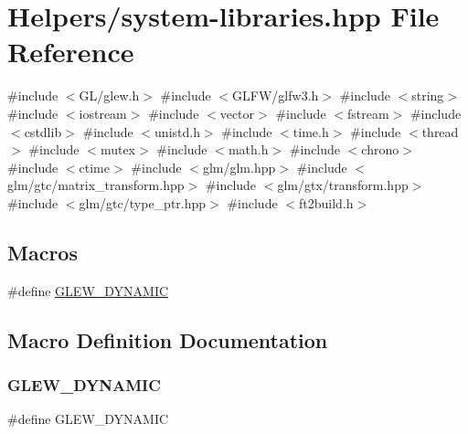 \hypertarget{system-libraries_8hpp}{}\section{Helpers/system-\/libraries.hpp File Reference}
\label{system-libraries_8hpp}
{\ttfamily \#include $<$G\+L/glew.\+h$>$}\newline
{\ttfamily \#include $<$G\+L\+F\+W/glfw3.\+h$>$}\newline
{\ttfamily \#include $<$string$>$}\newline
{\ttfamily \#include $<$iostream$>$}\newline
{\ttfamily \#include $<$vector$>$}\newline
{\ttfamily \#include $<$fstream$>$}\newline
{\ttfamily \#include $<$cstdlib$>$}\newline
{\ttfamily \#include $<$unistd.\+h$>$}\newline
{\ttfamily \#include $<$time.\+h$>$}\newline
{\ttfamily \#include $<$thread$>$}\newline
{\ttfamily \#include $<$mutex$>$}\newline
{\ttfamily \#include $<$math.\+h$>$}\newline
{\ttfamily \#include $<$chrono$>$}\newline
{\ttfamily \#include $<$ctime$>$}\newline
{\ttfamily \#include $<$glm/glm.\+hpp$>$}\newline
{\ttfamily \#include $<$glm/gtc/matrix\+\_\+transform.\+hpp$>$}\newline
{\ttfamily \#include $<$glm/gtx/transform.\+hpp$>$}\newline
{\ttfamily \#include $<$glm/gtc/type\+\_\+ptr.\+hpp$>$}\newline
{\ttfamily \#include $<$ft2build.\+h$>$}\newline
\subsection*{Macros}
\begin{DoxyCompactItemize}
\item 
\#define \mbox{\hyperlink{system-libraries_8hpp_a1df29b21e01c0880c00e4dca1cd34a20}{G\+L\+E\+W\+\_\+\+D\+Y\+N\+A\+M\+IC}}
\end{DoxyCompactItemize}


\subsection{Macro Definition Documentation}
\mbox{\label{system-libraries_8hpp_a1df29b21e01c0880c00e4dca1cd34a20}} 
\subsubsection{\texorpdfstring{G\+L\+E\+W\+\_\+\+D\+Y\+N\+A\+M\+IC}{GLEW\_DYNAMIC}}
{\footnotesize\ttfamily \#define G\+L\+E\+W\+\_\+\+D\+Y\+N\+A\+M\+IC}

